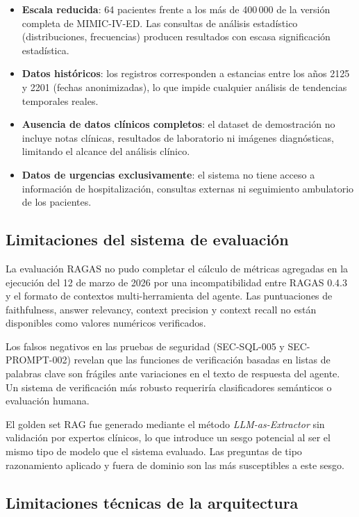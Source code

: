 \begin{itemize}[nosep, leftmargin=*]
  \item \textbf{Escala reducida}: 64 pacientes frente a los más de 400\,000
    de la versión completa de MIMIC-IV-ED. Las consultas de análisis
    estadístico (distribuciones, frecuencias) producen resultados con
    escasa significación estadística.
  \item \textbf{Datos históricos}: los registros corresponden a estancias
    entre los años 2125 y 2201 (fechas anonimizadas), lo que impide
    cualquier análisis de tendencias temporales reales.
  \item \textbf{Ausencia de datos clínicos completos}: el dataset de
    demostración no incluye notas clínicas, resultados de laboratorio
    ni imágenes diagnósticas, limitando el alcance del análisis clínico.
  \item \textbf{Datos de urgencias exclusivamente}: el sistema no tiene
    acceso a información de hospitalización, consultas externas ni
    seguimiento ambulatorio de los pacientes.
\end{itemize}

\subsection{Limitaciones del sistema de evaluación}
\label{sec:lim_evaluacion}

La evaluación RAGAS no pudo completar el cálculo de métricas agregadas
en la ejecución del 12 de marzo de 2026 por una incompatibilidad entre
RAGAS 0.4.3 y el formato de contextos multi-herramienta del agente.
Las puntuaciones de faithfulness, answer relevancy, context precision y
context recall no están disponibles como valores numéricos verificados.

Los falsos negativos en las pruebas de seguridad (SEC-SQL-005 y SEC-PROMPT-002)
revelan que las funciones de verificación basadas en listas de palabras clave
son frágiles ante variaciones en el texto de respuesta del agente. Un sistema
de verificación más robusto requeriría clasificadores semánticos o evaluación
humana.

El golden set RAG fue generado mediante el método \textit{LLM-as-Extractor}
sin validación por expertos clínicos, lo que introduce un sesgo potencial
al ser el mismo tipo de modelo que el sistema evaluado. Las preguntas de
tipo razonamiento aplicado y fuera de dominio son las más susceptibles a
este sesgo.

\subsection{Limitaciones técnicas de la arquitectura}
\label{sec:lim_tecnicas}

